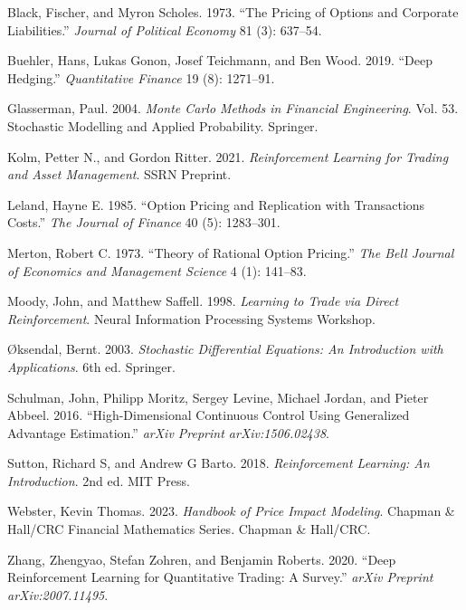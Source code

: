\documentclass[,11pt,letterpaper,twocolumn]{article}
\newlength{\cslhangindent}
\newenvironment{CSLReferences}[2] %
 {\begin{list}{}{%
  \setlength{\itemindent}{0pt}
  \setlength{\leftmargin}{0pt}
  \setlength{\parsep}{0pt}
  \ifodd #1
   \setlength{\leftmargin}{\cslhangindent}
   \setlength{\itemindent}{-1\cslhangindent}
  \fi
  \setlength{\itemsep}{#2\baselineskip}}}
 {\end{list}}
\begin{document}
\begin{CSLReferences}{1}{1}
Black, Fischer, and Myron Scholes. 1973. {``The Pricing of Options and
Corporate Liabilities.''} \emph{Journal of Political Economy} 81 (3):
637--54.

Buehler, Hans, Lukas Gonon, Josef Teichmann, and Ben Wood. 2019. {``Deep
Hedging.''} \emph{Quantitative Finance} 19 (8): 1271--91.

Glasserman, Paul. 2004. \emph{Monte Carlo Methods in Financial
Engineering}. Vol. 53. Stochastic Modelling and Applied Probability.
Springer.

Kolm, Petter N., and Gordon Ritter. 2021. \emph{Reinforcement Learning
for Trading and Asset Management}. SSRN Preprint.

Leland, Hayne E. 1985. {``Option Pricing and Replication with
Transactions Costs.''} \emph{The Journal of Finance} 40 (5): 1283--301.

Merton, Robert C. 1973. {``Theory of Rational Option Pricing.''}
\emph{The Bell Journal of Economics and Management Science} 4 (1):
141--83.

Moody, John, and Matthew Saffell. 1998. \emph{Learning to Trade via
Direct Reinforcement}. Neural Information Processing Systems Workshop.

Øksendal, Bernt. 2003. \emph{Stochastic Differential Equations: An
Introduction with Applications}. 6th ed. Springer.

Schulman, John, Philipp Moritz, Sergey Levine, Michael Jordan, and
Pieter Abbeel. 2016. {``High-Dimensional Continuous Control Using
Generalized Advantage Estimation.''} \emph{arXiv Preprint
arXiv:1506.02438}.

Sutton, Richard S, and Andrew G Barto. 2018. \emph{Reinforcement
Learning: An Introduction}. 2nd ed. MIT Press.

Webster, Kevin Thomas. 2023. \emph{Handbook of Price Impact Modeling}.
Chapman \& Hall/CRC Financial Mathematics Series. Chapman \& Hall/CRC.

Zhang, Zhengyao, Stefan Zohren, and Benjamin Roberts. 2020. {``Deep
Reinforcement Learning for Quantitative Trading: A Survey.''}
\emph{arXiv Preprint arXiv:2007.11495}.

\end{CSLReferences}
\end{document}
